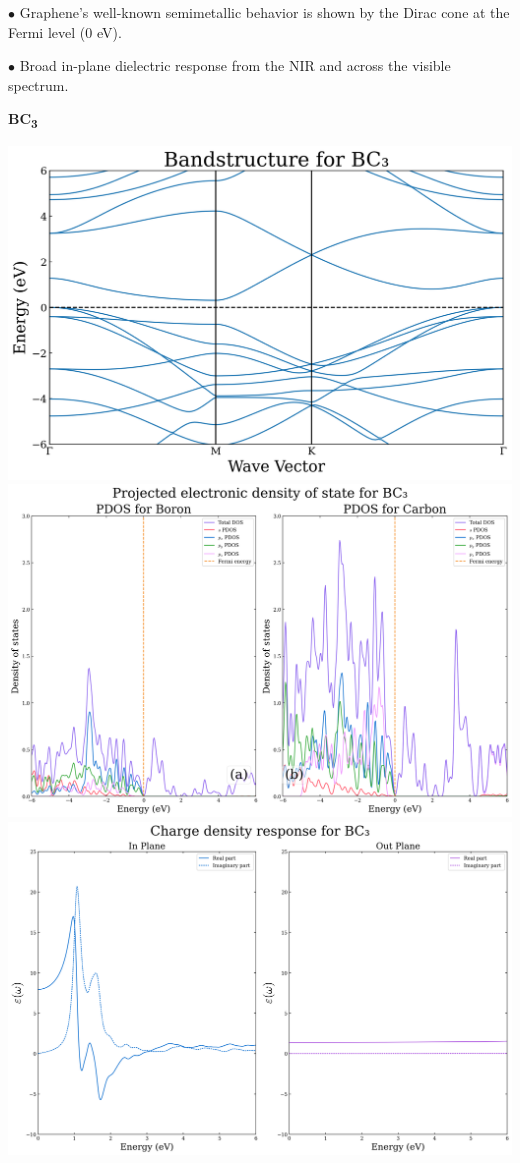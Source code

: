 \documentclass[a0paper,portrait]{baposter}
\begin{document}
\begin{poster}
{\vspace{0pt}\begin{minipage}{1\linewidth}\begin{center}\footnotesize
    \begin{tcolorbox}[colback=table_color_2, colframe=table_color_2, rounded corners, boxsep=2pt, left=0pt, right=0pt, top=0pt, bottom=0pt]
        \par $\bullet$ Graphene's well-known semimetallic behavior is shown by the Dirac cone at the Fermi level (0 eV). 
        \par $\bullet$ Broad in-plane dielectric response from the NIR and across the visible spectrum.
    \end{tcolorbox}
\end{center}\end{minipage}

\begin{center}\small\textbf{BC\textsubscript{3}}\end{center}

\begin{minipage}[t]{1\linewidth}\begin{center}
    \includegraphics[width=0.30\linewidth]{poster_figures/BC3_BS.pdf}
    \includegraphics[width=0.30\linewidth]{poster_figures/BC3_PDOS.pdf}
    \includegraphics[width=0.30\linewidth]{poster_figures/BC3_opt.pdf}
\end{center}\end{minipage}

}
\end{poster}
\end{document}
